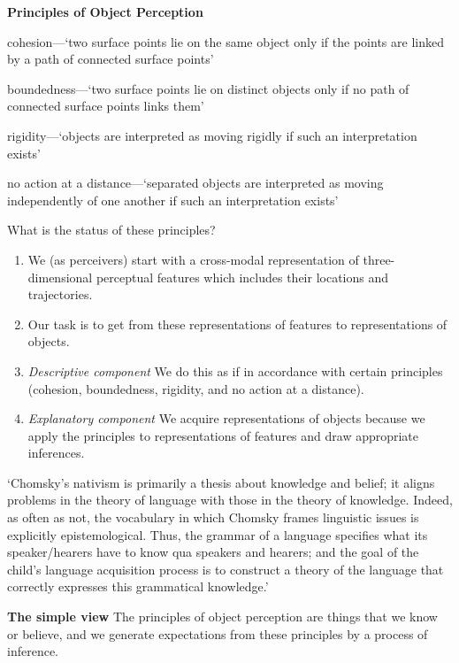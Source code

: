 \documentclass[12pt]{extarticle}
\begin{document}
\begin{multicols}{3}
\textbf{Principles of Object Perception \citep{Spelke:1990jn}}
 
cohesion—‘two surface points lie on the same object only if the points are linked by a path of 
connected surface points’
 
boundedness—‘two surface points lie on distinct objects only if no path of connected surface points 
links them’
 
rigidity—‘objects are interpreted as moving rigidly if such an interpretation exists’
 
no action at a distance—‘separated objects are interpreted as moving independently of one another if such an 
interpretation exists’
 
 
What is the status of these principles?
 
\begin{enumerate}

\item We (as perceivers) start with a cross-modal representation of three-dimensional 
perceptual features which includes their locations and trajectories.

\item Our task is to get from these representations of features to representations of objects.

\item \emph{Descriptive component} We do this as if in accordance with certain principles 
(cohesion, boundedness, rigidity, and no action at a distance).

\item \emph{Explanatory component}  We acquire representations of objects because we apply the 
principles to representations of features and draw appropriate inferences.

\end{enumerate}
 
‘Chomsky’s nativism is primarily a thesis about knowledge and belief; it aligns problems 
in the theory of language with those in the theory of knowledge.  Indeed, as often as not, 
the vocabulary in which Chomsky frames linguistic issues is explicitly epistemological.  
Thus, the grammar of a language specifies what its speaker/hearers have to know qua speakers 
and hearers; and the goal of the child’s language acquisition process is to construct a 
theory of the language that correctly expresses this grammatical knowledge.’
\citep[p.\ 11]{Fodor:2000cj}
 
\textbf{The simple view}
The principles of object perception are things that we know or believe, 
and we generate expectations from these principles by a process of inference.
 

\end{multicols}
\end{document}
